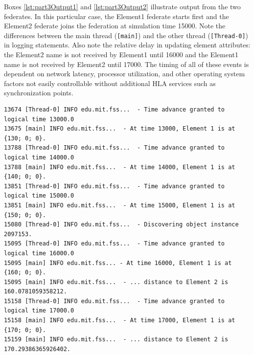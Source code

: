 \documentclass[]{article}
\begin{document}
Boxes \ref{lst:part3Output1} and \ref{lst:part3Output2} illustrate output from the two federates. In this particular case, the Element1 federate starts first and the Element2 federate joins the federation at simulation time 15000. Note the differences between the main thread (\texttt{[main]}) and the other thread (\texttt{[Thread-0]}) in logging statements. Also note the relative delay in updating element attributes: the Element2 name is not received by Element1 until 16000 and the Element1 name is not received by Element2 until 17000. The timing of all of these events is dependent on network latency, processor utilization, and other operating system factors not easily controllable without additional HLA services such as synchronization points.

\begin{Code}
\begin{lstlisting}[caption={Element1 partial main output},label={lst:part3Output1},numbers=none]
13674 [Thread-0] INFO edu.mit.fss...  - Time advance granted to logical time 13000.0
13675 [main] INFO edu.mit.fss...  - At time 13000, Element 1 is at {130; 0; 0}.
13788 [Thread-0] INFO edu.mit.fss...  - Time advance granted to logical time 14000.0
13788 [main] INFO edu.mit.fss...  - At time 14000, Element 1 is at {140; 0; 0}.
13851 [Thread-0] INFO edu.mit.fss...  - Time advance granted to logical time 15000.0
13851 [main] INFO edu.mit.fss...  - At time 15000, Element 1 is at {150; 0; 0}.
15080 [Thread-0] INFO edu.mit.fss...  - Discovering object instance 2097153.
15095 [Thread-0] INFO edu.mit.fss...  - Time advance granted to logical time 16000.0
15095 [main] INFO edu.mit.fss... - At time 16000, Element 1 is at {160; 0; 0}.
15095 [main] INFO edu.mit.fss...  - ... distance to Element 2 is 160.0781059358212.
15158 [Thread-0] INFO edu.mit.fss...  - Time advance granted to logical time 17000.0
15158 [main] INFO edu.mit.fss...  - At time 17000, Element 1 is at {170; 0; 0}.
15159 [main] INFO edu.mit.fss...  - ... distance to Element 2 is 170.29386365926402.
\end{lstlisting}
\end{Code}
\end{document}
